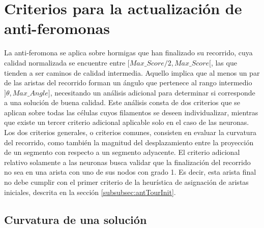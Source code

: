 

\clearpage

\section{Criterios para la actualizaci\'on de anti-feromonas}

La anti-feromona se aplica sobre hormigas que han finalizado su recorrido, cuya calidad normalizada se encuentre entre $[Max\_Score/2, Max\_Score[$, las que tienden a ser caminos de calidad intermedia. Aquello implica que al menos un par de las aristas del recorrido forman un \'angulo que pertenece al rango intermedio $]\theta, Max\_Angle]$, necesitando un an\'alisis adicional para determinar si corresponde a una soluci\'on de buena calidad. Este an\'alisis consta de dos criterios que se aplican sobre todas las c\'elulas cuyos filamentos se deseen individualizar, mientras que existe un tercer criterio adicional aplicable solo en el caso de las neuronas. Los dos criterios generales, o criterios comunes, consisten en evaluar la curvatura del recorrido, como tambi\'en la magnitud del desplazamiento entre la proyecci\'on de un segmento con respecto a un segmento adyacente. El criterio adicional relativo solamente a las neuronas busca validar que la finalizaci\'on del recorrido no sea en una arista con uno de sus nodos con grado 1. Es decir, esta arista final no debe cumplir con el primer criterio de la heur\'istica de asignaci\'on de aristas iniciales, descrita en la secci\'on \ref{subsubsec:antTourInit}.

\subsection{Curvatura de una soluci\'on}


